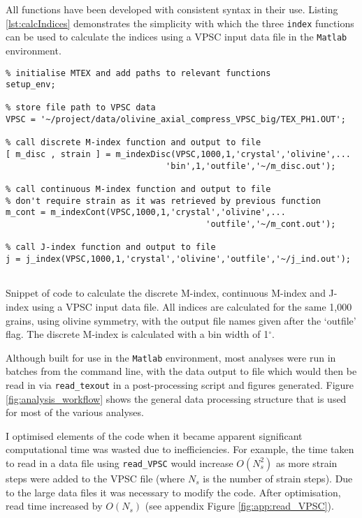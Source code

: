 \documentclass[a4paper,12pt,twoside]{report}
\numberwithin{equation}{chapter}
\begin{document}
All functions have been developed with consistent syntax in their use. Listing \ref{lst:calcIndices} demonstrates the simplicity with which the three \texttt{index} functions can be used to calculate the indices using a VPSC input data file in the \texttt{Matlab} environment.

\begin{program}[htbp] 
   \centering
   \begin{lstlisting}
% initialise MTEX and add paths to relevant functions
setup_env;   
   
% store file path to VPSC data
VPSC = '~/project/data/olivine_axial_compress_VPSC_big/TEX_PH1.OUT';

% call discrete M-index function and output to file
[ m_disc , strain ] = m_indexDisc(VPSC,1000,1,'crystal','olivine',...
                                'bin',1,'outfile','~/m_disc.out');

% call continuous M-index function and output to file
% don't require strain as it was retrieved by previous function
m_cont = m_indexCont(VPSC,1000,1,'crystal','olivine',...
                                        'outfile','~/m_cont.out');

% call J-index function and output to file
j = j_index(VPSC,1000,1,'crystal','olivine','outfile','~/j_ind.out');


 \end{lstlisting}
   \caption{Snippet of code to calculate the discrete M-index, continuous M-index and J-index using a VPSC input data file. All indices are calculated for the same 1,000 grains, using olivine symmetry, with the output file names given after the \lq{}outfile\rq{} flag. The discrete M-index is calculated with a bin width of 1$^\circ$.}
   \label{lst:calcIndices}
\end{program}

Although built for use in the \texttt{Matlab} environment, most analyses were run in batches from the command line, with the data output to file which would then be read in via \texttt{read\_{}texout} in a post-processing script and figures generated. Figure \ref{fig:analysis_workflow} shows the general data processing structure that is used for most of the various analyses.

I optimised elements of the code when it became apparent significant computational time was wasted due to inefficiencies. For example, the time taken to read in a data file using \texttt{read\_{}VPSC} would increase $O(N_s^2)$ as more strain steps were added to the VPSC file (where $N_s$ is the number of strain steps). Due to the large data files it was necessary to modify the code. After optimisation, read time increased by $O(N_s)$ (see appendix Figure \ref{fig:app:read_VPSC}). 
\end{document}
